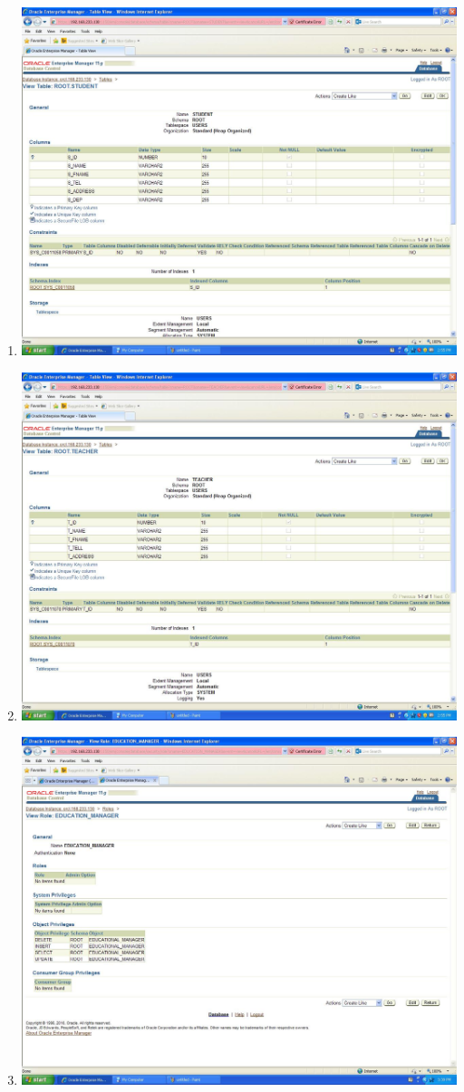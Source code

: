 \documentclass{article}
\begin{document}
\begin{enumerate}
	\item
		\includegraphics[scale=0.4]{figs/9.JPG}
	\item
		\includegraphics[scale=0.4]{figs/10.JPG}
	\item
		\includegraphics[scale=0.4]{figs/11.JPG}

\end{enumerate}
\end{document}
